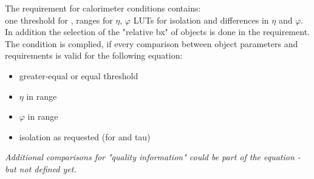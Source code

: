 The requirement for calorimeter conditions contains:\\
one threshold for \et, ranges for $\eta$, $\varphi$ LUTs for isolation and differences in $\eta$ and $\varphi$. In addition the selection of the "relative bx" of objects
is done in the requirement.\\
The condition is complied, if every comparison between object parameters and requirements is valid for the following equation:
\begin{itemize}
\item \et greater-equal or equal threshold
\item $\eta$ in range
\item $\varphi$ in range
\item isolation as requested (for \egamma and tau)
\end{itemize}
\textit{Additional comparisons for "quality information" could be part of the equation - but not defined yet.}

